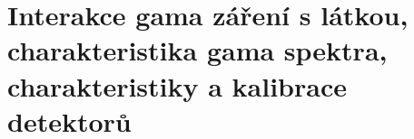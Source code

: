 \section[Interakce gamma záření]{Interakce gama záření s látkou, charakteristika gama spektra, charakteristiky a kalibrace detektorů}

